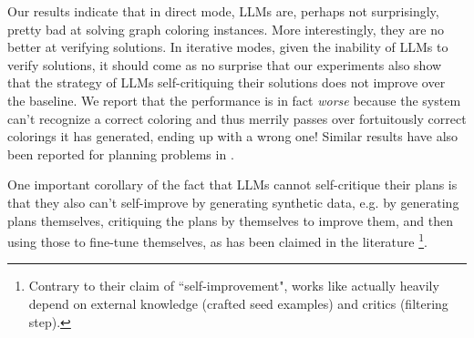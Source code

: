 \documentclass{article}
\newcommand{\rao}[1]{\noindent\textcolor{red}{#1}}
\theoremstyle{plain}
\theoremstyle{definition}
\theoremstyle{remark}
\begin{document}

Our results indicate that in direct mode, LLMs are, perhaps not surprisingly, pretty bad at solving graph coloring instances. More interestingly, they are no better at verifying solutions. In iterative modes, given the inability of LLMs to verify solutions, it should come as no surprise that our experiments also show that the strategy of LLMs self-critiquing their solutions does not improve over the baseline. We report that the performance is in fact {\em worse} because the system can't recognize a correct coloring and thus merrily passes over fortuitously correct colorings it has generated, ending up with a wrong one! Similar results have also been reported for planning problems in \cite{valmeekam2023on}. 


One important corollary of the fact that LLMs cannot self-critique their plans is that they also can't self-improve by generating synthetic data, e.g. by generating plans themselves, critiquing the plans by themselves to improve them, and then using those to fine-tune themselves, as has been claimed in the literature \cite{huang-etal-2023-large, wang2022self}\footnote{Contrary to their claim of ``self-improvement", works like \cite{wang2022self} actually heavily depend on external knowledge (crafted seed examples) and critics (filtering step).}.%






\end{document}
